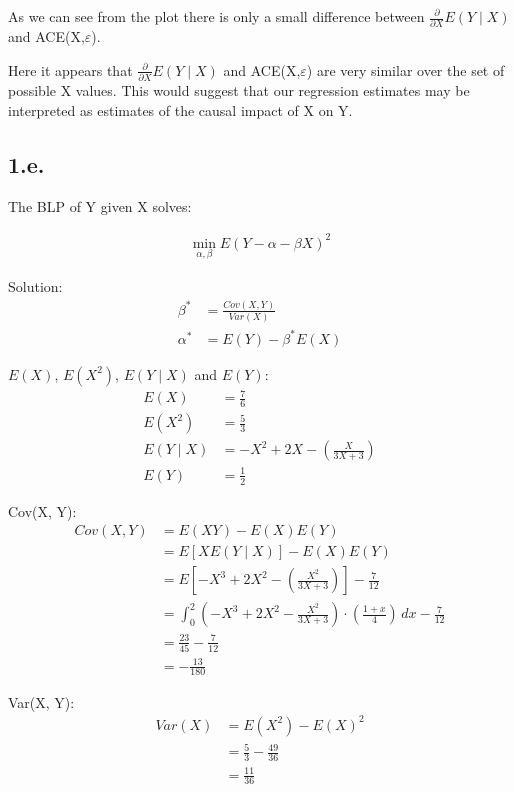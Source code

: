 \documentclass{article}
\begin{document}
As we can see from the plot there is only a small difference between $\frac{\partial}{\partial X}E(Y \mid X)$ and ACE(X,$\varepsilon$).

Here it appears that $\frac{\partial}{\partial X}E(Y \mid X)$ and ACE(X,$\varepsilon$) are very similar over the set of possible X values. This would suggest that our regression estimates may be interpreted as estimates of the causal impact of X on Y.

\subsection*{1.e.}
The BLP of Y given X solves:

\begin{align*}
    \min\limits_{\alpha , \beta} E(Y - \alpha - \beta X)^2
\end{align*}

Solution:
\begin{align*}
    \beta^{*} &= \frac{Cov(X, Y)}{Var(X)} \\
    \alpha^{*} &= E(Y) - \beta^{*} E(X) 
\end{align*}

$E(X)$, $E(X^2)$, $E(Y \mid X)$ and $E(Y)$:
\begin{align*}
    E(X) &= \frac{7}{6} \\
    E(X^2) &= \frac{5}{3} \\
    E(Y \mid X) &= -X^2 + 2X - \left(\frac{X}{3X+3}\right)\\
    E(Y) &= \frac{1}{2}
\end{align*}

Cov(X, Y):
\begin{align*}
    Cov(X, Y)
    &= E(XY) - E(X)E(Y)\\
    &= E[X E(Y \mid X)] - E(X)E(Y)\\
    &= E\left[-X^3 + 2X^2 - \left( \frac{X^2}{3X + 3} \right) \right] - \frac{7}{12} \\
    &= \int_{0}^{2}\left(-X^3 + 2X^2 -  \frac{X^2}{3X + 3} \right) \cdot \left( \frac{1+x}{4} \right) \,dx - \frac{7}{12}\\
    &= \frac{23}{45} - \frac{7}{12} \\
    &= -\frac{13}{180}
\end{align*}

Var(X, Y):
\begin{align*}
    Var(X)
    &= E(X^2) - E(X)^2\\
    &= \frac{5}{3} - \frac{49}{36} \\
    &= \frac{11}{36}
\end{align*}
\end{document}
